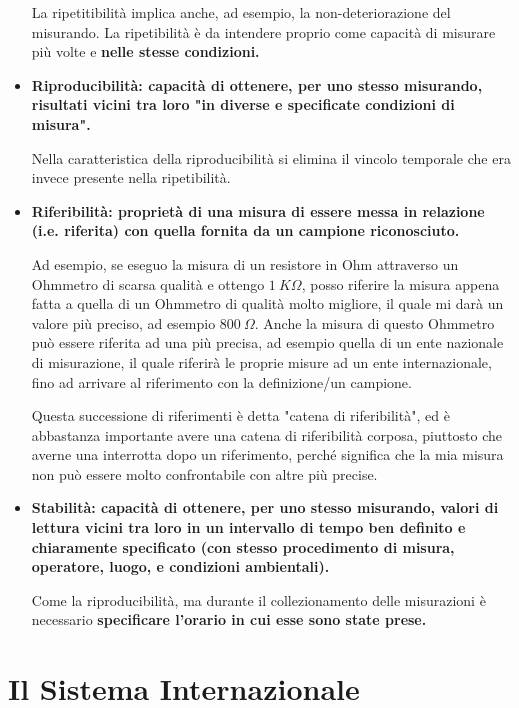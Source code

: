 \documentclass[a4paper,11pt]{report}
\begin{document}
\begin{itemize}
  La ripetitibilità implica anche, ad esempio, la non-deteriorazione del misurando. La ripetibilità è da intendere proprio come capacità di misurare più volte e \bf nelle stesse condizioni\rm.
  
  \item \bf Riproducibilità\rm: capacità di ottenere, per uno stesso misurando, risultati vicini tra loro "in diverse e specificate condizioni di misura".
  
  Nella caratteristica della riproducibilità si elimina il vincolo temporale che era invece presente nella ripetibilità.
  
  \item \bf Riferibilità\rm: proprietà di una misura di essere messa in relazione (i.e. riferita) con quella fornita da un campione riconosciuto.
  
  Ad esempio, se eseguo la misura di un resistore in Ohm attraverso un Ohmmetro di scarsa qualità e ottengo $1\ K\Omega$, posso riferire la misura appena fatta a quella di un Ohmmetro di qualità molto migliore, il quale mi darà un valore più preciso, ad esempio $800\ \Omega$. Anche la misura di questo Ohmmetro può essere riferita ad una più precisa, ad esempio quella di un ente nazionale di misurazione, il quale riferirà le proprie misure ad un ente internazionale, fino ad arrivare al riferimento con la definizione/un campione.
  
  Questa successione di riferimenti è detta "catena di riferibilità", ed è abbastanza importante avere una catena di riferibilità corposa, piuttosto che averne una interrotta dopo un riferimento, perché significa che la mia misura non può essere molto confrontabile con altre più precise.
  
    \item \bf Stabilità\rm: capacità di ottenere, per uno stesso misurando, valori di lettura vicini tra loro in un intervallo di tempo ben definito e chiaramente specificato (con stesso procedimento di misura, operatore, luogo, e condizioni ambientali).
    
    Come la riproducibilità, ma durante il collezionamento delle misurazioni è necessario \bf specificare \rm l'orario in cui esse sono state prese.
  
\end{itemize}
\section{Il Sistema Internazionale}
\end{document}
